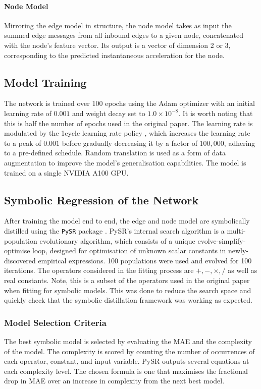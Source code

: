 \documentclass[11pt]{article}
\begin{document}
\paragraph*{Node Model} Mirroring the edge model in structure, the node model takes as input the summed edge messages from all inbound edges to a given node, concatenated with the node's feature vector. Its output is a vector of dimension 2 or 3, corresponding to the predicted instantaneous acceleration for the node.

\subsection{Model Training}
The network is trained over 100 epochs using the Adam optimizer with an initial learning rate of \(0.001\) and weight decay set to \(1.0 \times 10^{-8}\). It is worth noting that this is half the number of epochs used in the original paper. The learning rate is modulated by the 1cycle learning rate policy \cite{smith2018superconvergence}, which increases the learning rate to a peak of \(0.001\) before gradually decreasing it by a factor of \(100,000\), adhering to a pre-defined schedule. Random translation is used as a form of data augmentation to improve the model's generalisation capabilities. The model is trained on a single NVIDIA A100 GPU.

\subsection{Symbolic Regression of the Network}
After training the model end to end, the edge and node model are symbolically distilled using the \texttt{PySR} package \cite{cranmer2023interpretable}. PySR's internal search algorithm is a multi-population evolutionary algorithm, which consists of a unique evolve-simplify-optimise loop, designed for optimisation of unknown scalar constants in newly-discovered empirical expressions. 100 populations were used and evolved for 100 iterations. The operators considered in the fitting process are $ +, -, \times , /$ as well as real constants. Note, this is a subset of the operators used in the original paper when fitting for symbolic models. This was done to reduce the search space and quickly check that the symbolic distillation framework was working as expected.

\subsubsection{Model Selection Criteria}
The best symbolic model is selected by evaluating the MAE and the complexity of the model. The complexity is scored by counting the number of occurrences of each operator, constant, and input variable. PySR outputs several equations at each complexity level. The chosen formula is one that maximises the fractional drop in MAE over an increase in complexity from the next best model.
\end{document}
